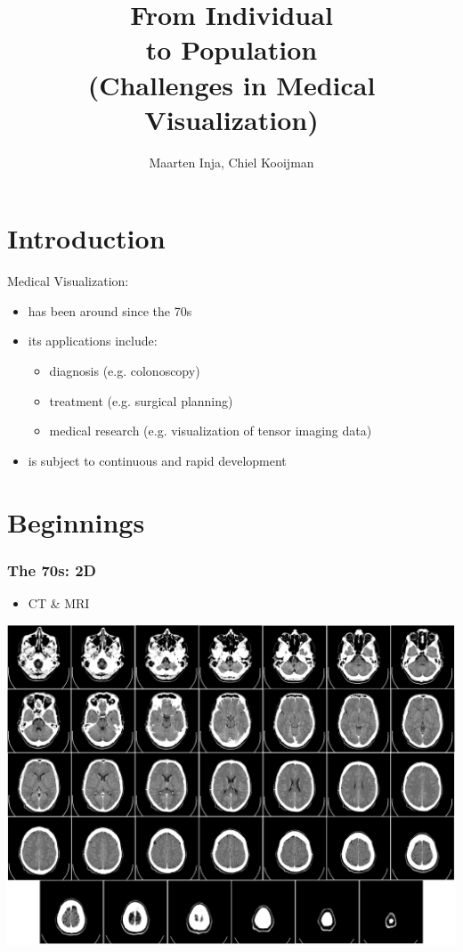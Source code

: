 \documentclass{beamer}
\title{From Individual\\to Population\\\Large (Challenges in Medical Visualization)}
\author{Maarten Inja, Chiel Kooijman}
\begin{document}
\begin{frame}
	\maketitle
\end{frame}

\section{Introduction}
\begin{frame}
	Medical Visualization:
	\begin{itemize}
		\item has been around since the 70s
		\item its applications include:
			\begin{itemize}
				\item diagnosis (e.g. colonoscopy)
				\item treatment (e.g. surgical planning)
				\item medical research (e.g. visualization of tensor imaging data)
			\end{itemize}
		\item is subject to continuous and rapid development
	\end{itemize}
\end{frame}

\section{Beginnings}
\begin{frame}
	\frametitle{The 70s: 2D}
	\begin{itemize}
		\item CT \& MRI
	\end{itemize}
	\begin{center}
		\includegraphics[width=.6\textwidth]{images/ct}
	\end{center}
\end{frame}
\end{document}
